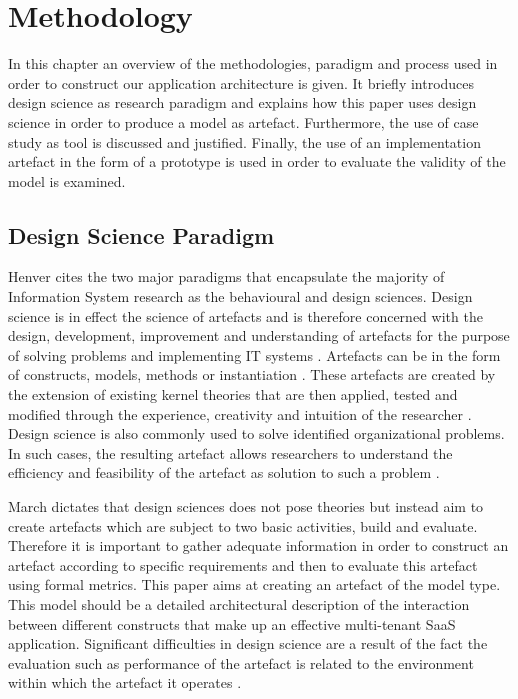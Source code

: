 \chapter{Methodology}

In this chapter an overview of the methodologies, paradigm and process used in order to construct our application architecture is given. It briefly introduces design science as research paradigm and explains how this paper uses design science in order to produce a model as artefact. Furthermore, the use of case study as tool is discussed and justified. Finally, the use of an implementation artefact in the form of a prototype is used in order to evaluate the validity of the model is examined.

\section{Design Science Paradigm}

Henver \cite{Hevner2004} cites the two major paradigms that encapsulate the majority of Information System research as the behavioural and design sciences. Design science is in effect the science of artefacts and is therefore concerned with the design, development, improvement and understanding of artefacts for the purpose of solving problems and implementing IT systems \cite{March1995a}. Artefacts can be in the form of constructs, models, methods or instantiation \cite{Hevner2004}. These artefacts are created by the extension of existing kernel theories that are then applied, tested and modified through the experience, creativity and intuition of the researcher \cite{Walls1992}. Design science is also commonly used to solve identified organizational problems. In such cases, the resulting artefact allows researchers to understand the efficiency and feasibility of the artefact as solution to such a problem \cite{Hevner2004}.
 
March \cite{March1995a} dictates that design sciences does not pose theories but instead aim to create artefacts which are subject to two basic activities, build and evaluate. Therefore it is important to gather adequate information in order to construct an artefact according to specific requirements and then to evaluate this artefact using formal metrics. This paper aims at creating an artefact of the model type. This model should be a detailed architectural description of the interaction between different constructs that make up an effective multi-tenant SaaS application. Significant difficulties in design science are a result of the fact the evaluation such as performance of the artefact is related to the environment within which the artefact it operates \cite{March1995a}.


